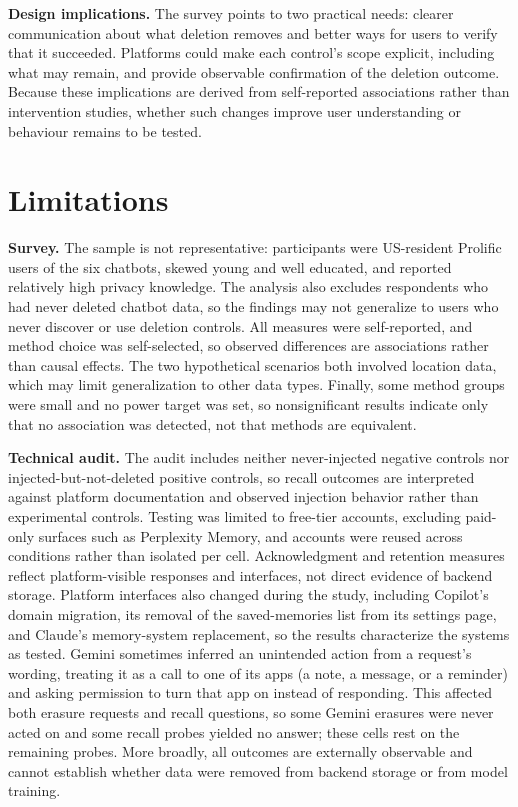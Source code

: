 \documentclass[conference,compsoc]{IEEEtran}
\begin{document}
\textbf{Design implications.} The survey points to two practical needs: clearer communication about what deletion removes and better ways for users to verify that it succeeded. Platforms could make each control's scope explicit, including what may remain, and provide observable confirmation of the deletion outcome. Because these implications are derived from self-reported associations rather than intervention studies, whether such changes improve user understanding or behaviour remains to be tested.

\section{Limitations}

\textbf{Survey.} The sample is not representative: participants were US-resident Prolific users of the six chatbots, skewed young and well educated, and reported relatively high privacy knowledge. The analysis also excludes respondents who had never deleted chatbot data, so the findings may not generalize to users who never discover or use deletion controls. All measures were self-reported, and method choice was self-selected, so observed differences are associations rather than causal effects. The two hypothetical scenarios both involved location data, which may limit generalization to other data types. Finally, some method groups were small and no power target was set, so nonsignificant results indicate only that no association was detected, not that methods are equivalent.

\textbf{Technical audit.} The audit includes neither never-injected negative controls nor injected-but-not-deleted positive controls, so recall outcomes are interpreted against platform documentation and observed injection behavior rather than experimental controls. Testing was limited to free-tier accounts, excluding paid-only surfaces such as Perplexity Memory, and accounts were reused across conditions rather than isolated per cell. Acknowledgment and retention measures reflect platform-visible responses and interfaces, not direct evidence of backend storage. Platform interfaces also changed during the study, including Copilot's domain migration, its removal of the saved-memories list from its settings page, and Claude's memory-system replacement, so the results characterize the systems as tested. Gemini sometimes inferred an unintended action from a request's wording, treating it as a call to one of its apps (a note, a message, or a reminder) and asking permission to turn that app on instead of responding. This affected both erasure requests and recall questions, so some Gemini erasures were never acted on and some recall probes yielded no answer; these cells rest on the remaining probes. More broadly, all outcomes are externally observable and cannot establish whether data were removed from backend storage or from model training.
\end{document}
